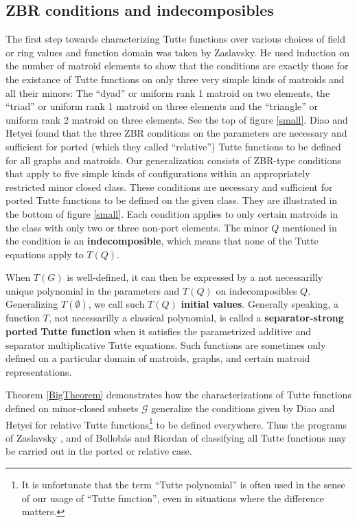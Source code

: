 \documentclass[12pt,leqno]{amsart}
\theoremstyle{remark}
\begin{document}
\subsection{ZBR conditions and indecomposibles}

The first step towards characterizing Tutte functions
over various choices of field or ring values and function domain
was taken by Zaslavsky\cite{MR93a:05047}. He used induction on the
number of matroid elements to show that the conditions are exactly
those for the existance of Tutte functions on only three very simple
kinds of matroids and all their minors: 
The ``dyad'' or uniform rank 1 matroid on two elements, the
``triad'' or uniform rank 1 matroid on three elements and the 
``triangle'' or uniform rank 2 matroid
on three elements.  See the top of
figure \ref{small}.  
Diao and Hetyei found that the three ZBR conditions on the 
parameters are necessary
and sufficient for ported (which they called ``relative'')
Tutte functions to be defined 
for all graphs and matroids.  Our generalization consists of
ZBR-type conditions that apply to five simple kinds of 
configurations within an appropriately restricted minor closed 
class.  These conditions are necessary and sufficient for
ported Tutte functions to be defined on the given class.
They are illustrated in the bottom of figure \ref{small}.
Each condition applies to only certain 
matroids in the class with only two or three non-port elements.
The minor $Q$ mentioned in the condition is an 
\textbf{indecomposible}, which means that
none of the Tutte equations apply to $T(Q)$.

When $T(G)$ is well-defined, it can then
be expressed by a not necessarilly unique polynomial in the parameters
and $T(Q)$ on indecomposibles $Q$.  Generalizing $T(\emptyset)$, we call
such $T(Q)$ \textbf{initial values}.
Generally speaking, a function $T$,
not necessarilly a classical
polynomial, is called a \textbf{separator-strong} \cite{JoAndTom} 
\textbf{ported} \cite{sdcPorted} \textbf{Tutte function} when it
satisfies the parametrized additive and separator multiplicative
Tutte equations.
Such functions are sometimes only defined
on a particular domain of matroids, graphs, and
certain matroid representations\cite{TutteEx}.


Theorem \ref{BigTheorem} demonstrates how
the 
characterizations\cite{MR93a:05047,BollobasRiordanTuttePolyColored,Ellis-Monaghan-Traldi} of Tutte functions
defined on minor-closed subsets $\mathcal{G}$ generalize the
conditions given by Diao and Hetyei for relative
Tutte functions\footnote{It is unfortunate that the term ``Tutte polynomial''
is often used in the sense of our usage of ``Tutte function'', even in
situations where the difference matters.}  
to be defined everywhere.  Thus the
programs of Zaslavsky \cite{MR93a:05047}, 
and of Bollob\'{a}s and Riordan 
\cite{BollobasRiordanTuttePolyColored} of classifying
all Tutte functions may be carried out in the 
ported or relative case.  
\end{document}
